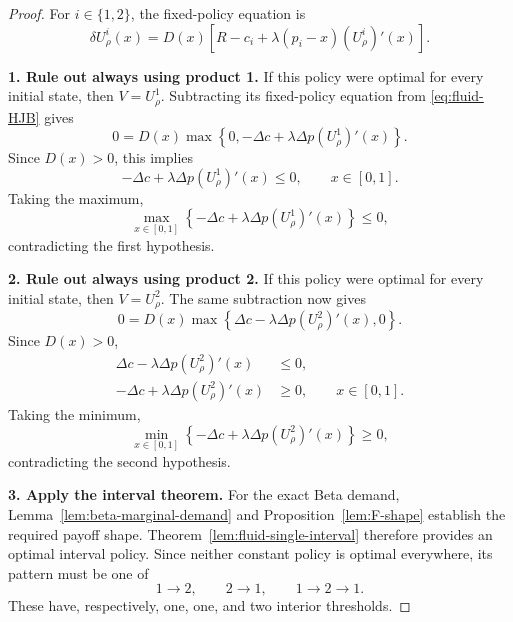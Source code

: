 \documentclass[11pt]{article}
\begin{document}
\begin{proof}
For $i\in\{1,2\}$, the fixed-policy equation is
\begin{equation*}
\delta U^i_\rho(x)
=D(x)\left[R-c_i+\lambda(p_i-x)(U^i_\rho)'(x)\right].
\end{equation*}

\medskip\noindent\textbf{1. Rule out always using product 1.}
If this policy were optimal for every initial state, then $V=U^1_\rho$.
Subtracting its fixed-policy equation from \eqref{eq:fluid-HJB} gives
\begin{equation*}
0=D(x)\max\left\{0,-\Delta c+\lambda\Delta p(U^1_\rho)'(x)\right\}.
\end{equation*}
Since $D(x)>0$, this implies
\begin{equation*}
-\Delta c+\lambda\Delta p(U^1_\rho)'(x)\le0,
\qquad x\in[0,1].
\end{equation*}
Taking the maximum,
\begin{equation*}
\max_{x\in[0,1]}
\left\{-\Delta c+\lambda\Delta p(U^1_\rho)'(x)\right\}\le0,
\end{equation*}
contradicting the first hypothesis.

\medskip\noindent\textbf{2. Rule out always using product 2.}
If this policy were optimal for every initial state, then $V=U^2_\rho$.
The same subtraction now gives
\begin{equation*}
0=D(x)\max\left\{\Delta c-\lambda\Delta p(U^2_\rho)'(x),0\right\}.
\end{equation*}
Since $D(x)>0$,
\begin{align*}
\Delta c-\lambda\Delta p(U^2_\rho)'(x)&\le0,\\
-\Delta c+\lambda\Delta p(U^2_\rho)'(x)&\ge0,
\qquad x\in[0,1].
\end{align*}
Taking the minimum,
\begin{equation*}
\min_{x\in[0,1]}
\left\{-\Delta c+\lambda\Delta p(U^2_\rho)'(x)\right\}\ge0,
\end{equation*}
contradicting the second hypothesis.

\medskip\noindent\textbf{3. Apply the interval theorem.}
For the exact Beta demand, Lemma~\ref{lem:beta-marginal-demand}
and Proposition~\ref{lem:F-shape} establish the required payoff shape.
Theorem~\ref{lem:fluid-single-interval} therefore provides an optimal
interval policy. Since neither constant policy is optimal everywhere,
its pattern must be one of
\begin{equation*}
1\longrightarrow2,\qquad
2\longrightarrow1,\qquad
1\longrightarrow2\longrightarrow1.
\end{equation*}
These have, respectively, one, one, and two interior thresholds.
\end{proof}
\end{document}
